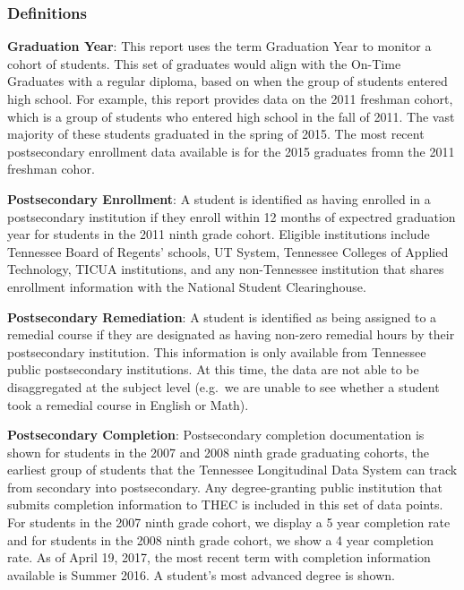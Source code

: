 \documentclass[11pt,]{article}
\begin{document}
\newpage 

\newpage

\subsubsection{Definitions}\label{definitions}

\textbf{Graduation Year}: This report uses the term Graduation Year to
monitor a cohort of students. This set of graduates would align with the
On-Time Graduates with a regular diploma, based on when the group of
students entered high school. For example, this report provides data on
the 2011 freshman cohort, which is a group of students who entered high
school in the fall of 2011. The vast majority of these students
graduated in the spring of 2015. The most recent postsecondary
enrollment data available is for the 2015 graduates fromn the 2011
freshman cohor.

\textbf{Postsecondary Enrollment}: A student is identified as having
enrolled in a postsecondary institution if they enroll within 12 months
of expectred graduation year for students in the 2011 ninth grade
cohort. Eligible institutions include Tennessee Board of Regents'
schools, UT System, Tennessee Colleges of Applied Technology, TICUA
institutions, and any non-Tennessee institution that shares enrollment
information with the National Student Clearinghouse.

\textbf{Postsecondary Remediation}: A student is identified as being
assigned to a remedial course if they are designated as having non-zero
remedial hours by their postsecondary institution. This information is
only available from Tennessee public postsecondary institutions. At this
time, the data are not able to be disaggregated at the subject level
(e.g.~we are unable to see whether a student took a remedial course in
English or Math).

\textbf{Postsecondary Completion}: Postsecondary completion
documentation is shown for students in the 2007 and 2008 ninth grade
graduating cohorts, the earliest group of students that the Tennessee
Longitudinal Data System can track from secondary into postsecondary.
Any degree-granting public institution that submits completion
information to THEC is included in this set of data points. For students
in the 2007 ninth grade cohort, we display a 5 year completion rate and
for students in the 2008 ninth grade cohort, we show a 4 year completion
rate. As of April 19, 2017, the most recent term with completion
information available is Summer 2016. A student's most advanced degree
is shown.
\end{document}
